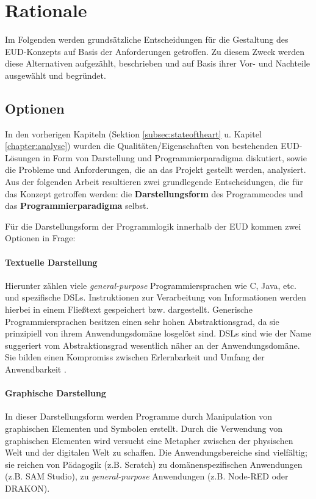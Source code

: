 \section{Rationale}\label{sec:einleitungkonzept}
Im Folgenden werden grundsätzliche Entscheidungen für die Gestaltung des \ac{EUD}-Kon\-zepts auf Basis der Anforderungen getroffen. Zu diesem Zweck werden diese Alternativen aufgezählt, beschrieben und auf Basis ihrer Vor- und Nachteile ausgewählt und begründet.

\subsection{Optionen}\label{subsec:optionen}
In den vorherigen Kapiteln (Sektion \ref{subsec:stateoftheart} u. Kapitel \ref{chapter:analyse}) wurden die Qualitäten/Eigenschaften von bestehenden \ac{EUD}-Lösungen in Form von Darstellung und Programmierparadigma diskutiert, sowie die Probleme und Anforderungen, die an das Projekt gestellt werden, analysiert. Aus der folgenden Arbeit resultieren zwei grundlegende Entscheidungen, die für das Konzept getroffen werden: die \textbf{Darstellungsform} des Programmcodes und das \textbf{Programmierparadigma} selbst. 

Für die Darstellungsform der Programmlogik innerhalb der \ac{EUD} kommen zwei Optionen in Frage:
\paragraph{Textuelle Darstellung} Hierunter zählen viele \textit{general-purpose} Programmiersprachen wie C, Java, etc. und spezifische \acp{DSL}. Instruktionen zur Verarbeitung von Informationen werden hierbei in einem Fließtext gespeichert bzw. dargestellt. Generische Programmiersprachen besitzen einen sehr hohen Abstraktionsgrad, da sie prinzipiell von ihrem Anwendungsdomäne losgelöst sind. \acp{DSL} sind wie der Name suggeriert vom Abstraktionsgrad wesentlich näher an der Anwendungsdomäne. Sie bilden einen Kompromiss zwischen Erlernbarkeit und Umfang der Anwendbarkeit \cite{green1991comprehensibility}.

\paragraph{Graphische Darstellung} In dieser Darstellungsform werden Programme durch Manipulation von graphischen Elementen und Symbolen erstellt. Durch die Verwendung von graphischen Elementen wird versucht eine Metapher zwischen der physischen Welt und der digitalen Welt zu schaffen. Die Anwendungsbereiche sind vielfältig; sie reichen von Pädagogik (z.B. Scratch) zu domänenspezifischen Anwendungen (z.B. SAM Studio), zu \textit{general-purpose} Anwendungen (z.B. Node-RED oder DRAKON). 

